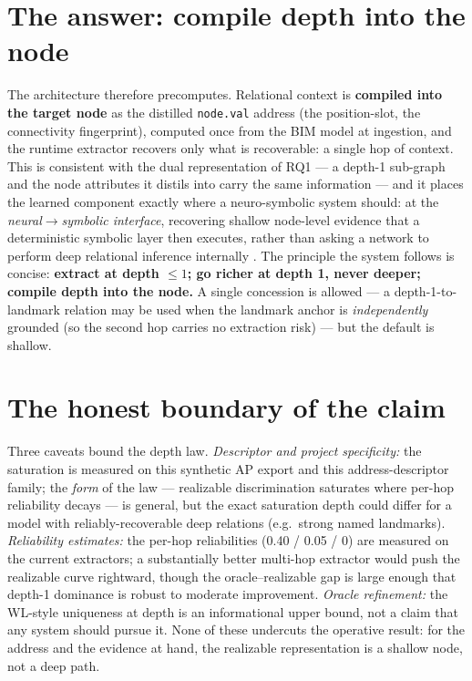 \section{The answer: compile depth into the node}

The architecture therefore precomputes. Relational context is \textbf{compiled into the target node}
as the distilled \texttt{node.val} address (the position-slot, the connectivity fingerprint), computed
once from the BIM model at ingestion, and the runtime extractor recovers only what is recoverable: a
single hop of context. This is consistent with the dual representation of RQ1 --- a depth-1 sub-graph
and the node attributes it distils into carry the same information --- and it places the learned
component exactly where a neuro-symbolic system should: at the \emph{neural$\to$symbolic interface},
recovering shallow node-level evidence that a deterministic symbolic layer then executes, rather than
asking a network to perform deep relational inference internally \citep{mao2019nscl}. The principle the
system follows is concise: \textbf{extract at depth $\le 1$; go richer at depth 1, never deeper;
compile depth into the node.} A single concession is allowed --- a depth-1-to-landmark relation may be
used when the landmark anchor is \emph{independently} grounded (so the second hop carries no extraction
risk) --- but the default is shallow.

\section{The honest boundary of the claim}

Three caveats bound the depth law. \emph{Descriptor and project specificity:} the saturation is
measured on this synthetic AP export and this address-descriptor family; the \emph{form} of the law
--- realizable discrimination saturates where per-hop reliability decays --- is general, but the exact
saturation depth could differ for a model with reliably-recoverable deep relations (e.g.\ strong named
landmarks). \emph{Reliability estimates:} the per-hop reliabilities (0.40 / 0.05 / 0) are measured on
the current extractors; a substantially better multi-hop extractor would push the realizable curve
rightward, though the oracle--realizable gap is large enough that depth-1 dominance is robust to
moderate improvement. \emph{Oracle refinement:} the WL-style uniqueness at depth is an informational
upper bound, not a claim that any system should pursue it. None of these undercuts the operative
result: for the address and the evidence at hand, the realizable representation is a shallow node, not
a deep path.


